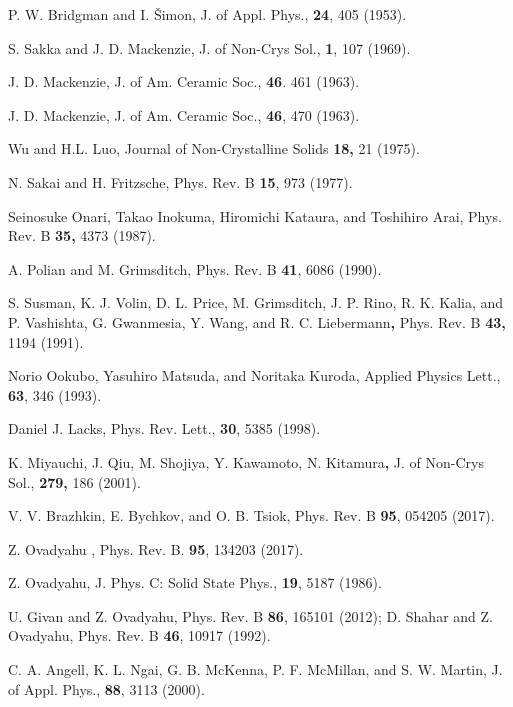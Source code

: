 \documentclass
[preprint,showpacs,byrevtex,10pt,twocolumn,tightenlines,prl,letterpaper]{revtex4}%
\begin{document}
\begin{thebibliography}{99}                                                                                               %


P. W. Bridgman and I. \v{S}imon, J. of Appl. Phys., \textbf{24},
405 (1953).

S. Sakka and J. D. Mackenzie, J. of Non-Crys Sol., \textbf{1}, 107 (1969).

J. D. Mackenzie, J. of Am. Ceramic Soc., \textbf{46}. 461 (1963).

J. D. Mackenzie, J. of Am. Ceramic Soc., \textbf{46}, 470 (1963).

Wu and H.L. Luo, Journal of Non-Crystalline Solids \textbf{18,} 21 (1975).

N. Sakai and H. Fritzsche, Phys. Rev. B \textbf{15}, 973 (1977).

Seinosuke Onari, Takao Inokuma, Hiromichi Kataura, and Toshihiro
Arai, Phys. Rev. B \textbf{35,} 4373 (1987).

A. Polian and M. Grimsditch, Phys. Rev. B \textbf{41}, 6086 (1990).

S. Susman, K. J. Volin, D. L. Price, M. Grimsditch, J. P. Rino, R.
K. Kalia, and P. Vashishta, G. Gwanmesia, Y. Wang, and R. C.
Liebermann\textbf{,} Phys. Rev. B \textbf{43, }1194 (1991).

Norio Ookubo, Yasuhiro Matsuda, and Noritaka Kuroda, Applied
Physics Lett., \textbf{63}, 346 (1993).

Daniel J. Lacks, Phys. Rev. Lett., \textbf{30}, 5385 (1998).

K. Miyauchi, J. Qiu, M. Shojiya, Y. Kawamoto, N.
Kitamura\textbf{, }J. of Non-Crys Sol., \textbf{279, }186 (2001).

V. V. Brazhkin, E. Bychkov, and O. B. Tsiok, Phys. Rev. B
\textbf{95}, 054205 (2017).

Z. Ovadyahu , Phys. Rev. B. \textbf{95}, 134203 (2017).

Z. Ovadyahu, J. Phys. C: Solid State Phys., \textbf{19}, 5187 (1986).

U. Givan and Z. Ovadyahu, Phys. Rev. B \textbf{86}, 165101
(2012); D. Shahar and Z. Ovadyahu, Phys. Rev. B \textbf{46}, 10917 (1992).

C. A. Angell, K. L. Ngai, G. B. McKenna, P. F. McMillan, and S.
W. Martin, J. of Appl. Phys., \textbf{88}, 3113 (2000).


\end{thebibliography}
\end{document}
